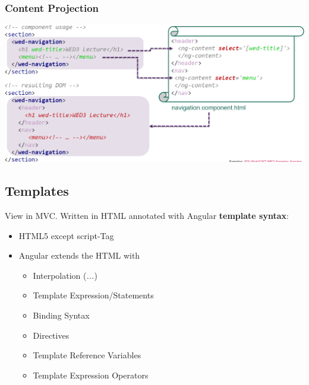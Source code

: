 \subsubsection{Content Projection}
\includegraphics[width=\linewidth]{img/angular_content_projection.png}

\subsection{Templates}
View in MVC.
Written in HTML annotated with Angular \textbf{template syntax}:
\begin{itemize}
    \item HTML5 except script-Tag
    \item Angular extends the HTML with
    \begin{itemize}
        \item Interpolation (\textit{{{...}}})
        \item Template Expression/Statements
        \item Binding Syntax
        \item Directives
        \item Template Reference Variables
        \item Template Expression Operators
    \end{itemize}
\end{itemize}

